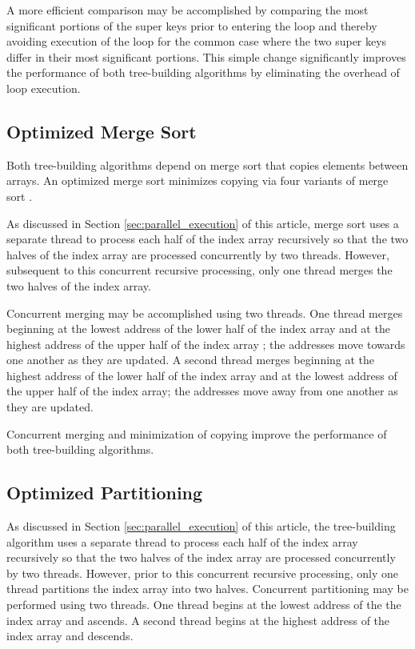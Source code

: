 \documentclass{sig-alternate}
\begin{document}
A more efficient comparison may be accomplished by comparing the most significant portions of the super keys prior to entering the loop and thereby avoiding execution of the loop for the common case where the two super keys differ in their most significant portions. This simple change significantly improves the performance of both tree-building algorithms by eliminating the overhead of loop execution.

\subsection{Optimized Merge Sort}

Both tree-building algorithms depend on merge sort \cite{Sedgewick} that copies elements between arrays.  An optimized merge sort minimizes copying via four variants of merge sort \cite{Sedgewick2}.

As discussed in Section \ref{sec:parallel_execution} of this article, merge sort uses a separate thread to process each half of the index array recursively so that the two halves of the index array are processed concurrently by two threads.  However, subsequent to this concurrent recursive processing, only one thread merges the two halves of the index array. 

Concurrent merging may be accomplished using two threads.  One thread merges beginning at the lowest address of the lower half of the index array and at the highest address of the upper half of the index array \cite{Sedgewick}; the addresses move towards one another as they are updated. A second thread merges beginning at the highest address of the lower half of the index array and at the lowest address of the upper half of the index array; the addresses move away from one another as they are updated.

Concurrent merging and minimization of copying improve the performance of both tree-building algorithms.

\newpage
\subsection{Optimized Partitioning}

As discussed in Section \ref{sec:parallel_execution} of this article, the  tree-building algorithm uses a separate thread to process each half of the index array recursively so that the two halves of the index array are processed concurrently by two threads.  However, prior to this concurrent recursive processing, only one thread partitions the index array into two halves. Concurrent partitioning may be performed using two threads. One thread begins at the lowest address of the the index array and ascends. A second thread begins at the highest address of the index array and descends.
\end{document}
